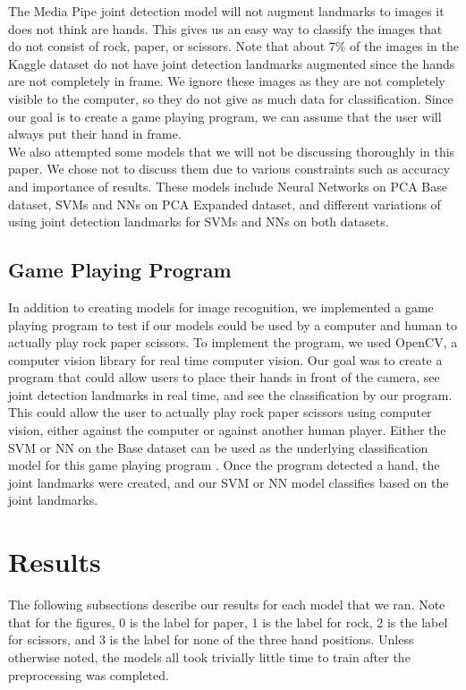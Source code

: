 \documentclass{article}
\begin{document}
The Media Pipe joint detection model will not augment landmarks to images it does not think are hands. This gives us an easy way to classify the images that do not consist of rock, paper, or scissors. Note that about 7\% of the images in the Kaggle dataset do not have joint detection landmarks augmented since the hands are not completely in frame. We ignore these images as they are not completely visible to the computer, so they do not give as much data for classification. Since our goal is to create a game playing program, we can assume that the user will always put their hand in frame. \\
We also attempted some models that we will not be discussing thoroughly in this paper. We chose not to discuss them due to various constraints such as accuracy and importance of results. These models include Neural Networks on PCA Base dataset, SVMs and NNs on PCA Expanded dataset, and different variations of using joint detection landmarks for SVMs and NNs on both datasets.

\subsection{Game Playing Program}
In addition to creating models for image recognition, we implemented a game playing program to test if our models could be used by a computer and human to actually play rock paper scissors. To implement the program, we used OpenCV, a computer vision library for real time computer vision. Our goal was to create a program that could allow users to place their hands in front of the camera, see joint detection landmarks in real time, and see the classification by our program. This could allow the user to actually play rock paper scissors using computer vision, either against the computer or against another human player. Either the SVM or NN on the Base dataset can be used as the underlying classification model for this game playing program . Once the program detected a hand, the joint landmarks were created, and our SVM or NN model classifies based on the joint landmarks.

\section{Results}
The following subsections describe our results for each model that we ran. Note that for the figures, 0 is the label for paper, 1 is the label for rock, 2 is the label for scissors, and 3 is the label for none of the three hand positions. Unless otherwise noted, the models all took trivially little time to train after the preprocessing was completed.
\end{document}
